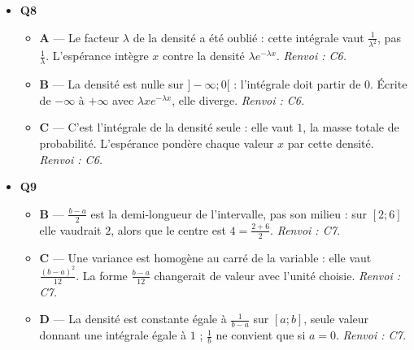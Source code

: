 \begin{itemize}
\begin{itemize}
  \end{itemize}
  \item \textbf{Q8}
  \begin{itemize}
    \item \textbf{A} — Le facteur $\lambda$ de la densité a été oublié : cette intégrale vaut $\tfrac1{\lambda^2}$, pas $\tfrac1\lambda$. L'espérance intègre $x$ contre la densité $\lambda e^{-\lambda x}$. \emph{Renvoi : C6.}
    \item \textbf{B} — La densité est nulle sur $]-\infty;0[$ : l'intégrale doit partir de $0$. Écrite de $-\infty$ à $+\infty$ avec $\lambda x e^{-\lambda x}$, elle diverge. \emph{Renvoi : C6.}
    \item \textbf{C} — C'est l'intégrale de la densité seule : elle vaut $1$, la masse totale de probabilité. L'espérance pondère chaque valeur $x$ par cette densité. \emph{Renvoi : C6.}
  \end{itemize}
  \item \textbf{Q9}
  \begin{itemize}
    \item \textbf{B} — $\tfrac{b-a}2$ est la demi-longueur de l'intervalle, pas son milieu : sur $[2;6]$ elle vaudrait $2$, alors que le centre est $4=\tfrac{2+6}2$. \emph{Renvoi : C7.}
    \item \textbf{C} — Une variance est homogène au carré de la variable : elle vaut $\tfrac{(b-a)^2}{12}$. La forme $\tfrac{b-a}{12}$ changerait de valeur avec l'unité choisie. \emph{Renvoi : C7.}
    \item \textbf{D} — La densité est constante égale à $\tfrac1{b-a}$ sur $[a;b]$, seule valeur donnant une intégrale égale à $1$ ; $\tfrac1b$ ne convient que si $a=0$. \emph{Renvoi : C7.}
  \end{itemize}
\end{itemize}
\fi
